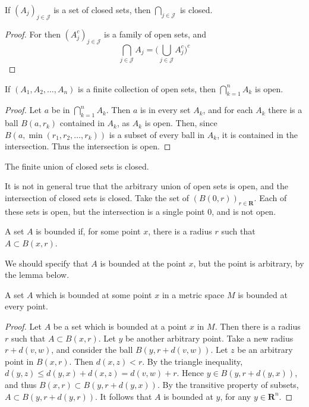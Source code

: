 \begin{corollary}
  If $(A_j)_{j \in \mathcal{J}}$ is a set of closed sets, then $\bigcap_{j \in \mathcal{J}}$ is closed.
\end{corollary}
\begin{proof}
  For then $(A_j^c)_{j \in \mathcal{J}}$ is a family of open sets, and
  \[ \bigcap_{j \in \mathcal{J}} A_j = \bigg( \bigcup_{j \in \mathcal{J}} A_j^c \bigg)^c \]
\end{proof}

\begin{theorem}
  If $(A_1, A_2, \dots, A_n)$ is a finite collection of open sets, then $\bigcap_{k = 1}^n A_k$ is open.
\end{theorem}
\begin{proof}
  Let $a$ be in $\bigcap_{k = 1}^n A_k$. Then $a$ is in every set $A_k$, and for each $A_k$ there is a ball $B(a,r_k)$ contained in $A_k$, as $A_k$ is open. Then, since $B(a,\min(r_1,r_2, \dots, r_k))$ is a subset of every ball in $A_k$, it is contained in the intersection. Thus the intersection is open.
\end{proof}

\begin{corollary}
  The finite union of closed sets is closed.
\end{corollary}

It is not in general true that the arbitrary union of open sets is open, and the intersection of closed sets is closed. Take the set of $(B(0,r))_{r \in \mathbf{R}}$. Each of these sets is open, but the intersection is a single point 0, and is not open.

\begin{definition}
  A set $A$ is bounded if, for some point $x$, there is a radius $r$ such that $A \subset B(x,r)$.
\end{definition}

We should specify that $A$ is bounded at the point $x$, but the point is arbitrary, by the lemma below.

\begin{lemma}
  A set $A$ which is bounded at some point $x$ in a metric space $M$ is bounded at every point.
\end{lemma}
\begin{proof}
  Let $A$ be a set which is bounded at a point $x$ in $M$. Then there is a radius $r$ such that $A \subset B(x,r)$. Let $y$ be another arbitrary point. Take a new radius $r + d(v,w)$, and consider the ball $B(y,r + d(v, w))$. Let $z$ be an arbitrary point in $B(x,r)$. Then $d(x, z) < r$. By the triangle inequality, $d(y, z) \leq d(y, x) + d(x, z) = d(v, w) + r$. Hence $y \in B(y,r + d(y, x))$, and thus $B(x,r) \subset B(y,r + d(y, x))$. By the transitive property of subsets, $A \subset B(y,r + d(y, r))$. It follows that $A$ is bounded at $y$, for any $y \in \mathbf{R}^n$.
\end{proof}

